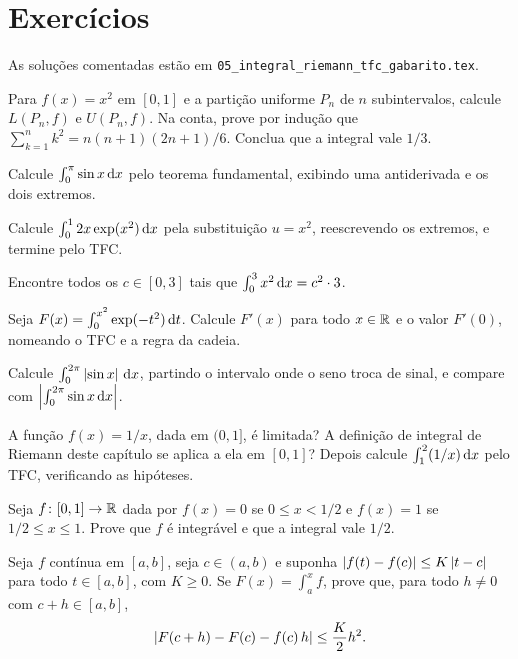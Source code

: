 \documentclass[11pt,a4paper]{article}
\begin{document}
\section{Exercícios}

As soluções comentadas estão em \texttt{05\_integral\_riemann\_tfc\_gabarito.tex}.

\begin{exercicio}
Para $f(x)=x^2$ em $[0,1]$ e a partição uniforme $P_n$ de $n$ subintervalos, calcule $L(P_n,f)$ e $U(P_n,f)$. Na conta, prove por indução que $\sum_{k=1}^n k^2=n(n+1)(2n+1)/6$. Conclua que a integral vale $1/3$.
\end{exercicio}

\begin{exercicio}
Calcule $\int_0^{\pi}\sin x\,\mathrm{d} x$ pelo teorema fundamental, exibindo uma antiderivada e os dois extremos.
\end{exercicio}

\begin{exercicio}
Calcule $\int_0^1 2x\exp(x^2)\,\mathrm{d} x$ pela substituição $u=x^2$, reescrevendo os extremos, e termine pelo TFC.
\end{exercicio}

\begin{exercicio}
Encontre todos os $c\in[0,3]$ tais que $\int_0^3 x^2\,\mathrm{d} x=c^2\cdot 3$.
\end{exercicio}

\begin{exercicio}
Seja $F(x)=\int_0^{x^2}\exp(-t^2)\,\mathrm{d} t$. Calcule $F'(x)$ para todo $x\in\mathbb{R}$ e o valor $F'(0)$, nomeando o TFC e a regra da cadeia.
\end{exercicio}

\begin{exercicio}
Calcule $\int_0^{2\pi}\left\lvert \sin x \right\rvert\,\mathrm{d} x$, partindo o intervalo onde o seno troca de sinal, e compare com $\left\lvert \int_0^{2\pi}\sin x\,\mathrm{d} x \right\rvert$.
\end{exercicio}

\begin{exercicio}
A função $f(x)=1/x$, dada em $(0,1]$, é limitada? A definição de integral de Riemann deste capítulo se aplica a ela em $[0,1]$? Depois calcule $\int_1^2(1/x)\,\mathrm{d} x$ pelo TFC, verificando as hipóteses.
\end{exercicio}

\begin{exercicio}
Seja $f\colon[0,1]\to\mathbb{R}$ dada por $f(x)=0$ se $0\le x<1/2$ e $f(x)=1$ se $1/2\le x\le 1$. Prove que $f$ é integrável e que a integral vale $1/2$.
\end{exercicio}

\begin{exercicio}
Seja $f$ contínua em $[a,b]$, seja $c\in(a,b)$ e suponha $\left\lvert f(t)-f(c) \right\rvert\le K\left\lvert t-c \right\rvert$ para todo $t\in[a,b]$, com $K\ge 0$. Se $F(x)=\int_a^x f$, prove que, para todo $h\neq 0$ com $c+h\in[a,b]$,
\[
\left\lvert F(c+h)-F(c)-f(c)\,h \right\rvert\le\frac{K}{2}h^2.
\]
\end{exercicio}
\end{document}
